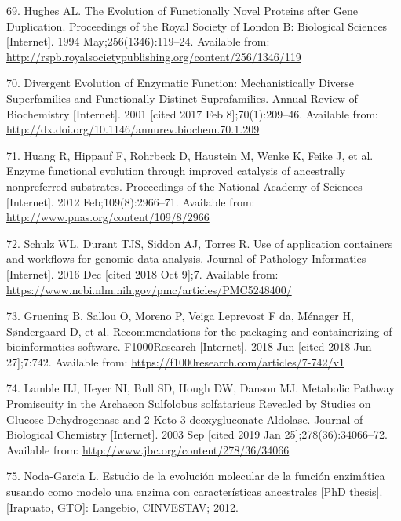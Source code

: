 \documentclass[12pt,twoside]{reedthesis}
\begin{document}
  \hypertarget{ref-hughes_evolution_1994}{}
  69. Hughes AL. The Evolution of Functionally Novel Proteins after Gene
  Duplication. Proceedings of the Royal Society of London B: Biological
  Sciences {[}Internet{]}. 1994 May;256(1346):119--24. Available from:
  \url{http://rspb.royalsocietypublishing.org/content/256/1346/119}
  
  \hypertarget{ref-gerlt_divergent_2001}{}
  70. Divergent Evolution of Enzymatic Function: Mechanistically Diverse
  Superfamilies and Functionally Distinct Suprafamilies. Annual Review of
  Biochemistry {[}Internet{]}. 2001 {[}cited 2017 Feb 8{]};70(1):209--46.
  Available from: \url{http://dx.doi.org/10.1146/annurev.biochem.70.1.209}
  
  \hypertarget{ref-huang_enzyme_2012}{}
  71. Huang R, Hippauf F, Rohrbeck D, Haustein M, Wenke K, Feike J, et al.
  Enzyme functional evolution through improved catalysis of ancestrally
  nonpreferred substrates. Proceedings of the National Academy of Sciences
  {[}Internet{]}. 2012 Feb;109(8):2966--71. Available from:
  \url{http://www.pnas.org/content/109/8/2966}
  
  \hypertarget{ref-schulz_use_2016}{}
  72. Schulz WL, Durant TJS, Siddon AJ, Torres R. Use of application
  containers and workflows for genomic data analysis. Journal of Pathology
  Informatics {[}Internet{]}. 2016 Dec {[}cited 2018 Oct 9{]};7. Available
  from: \url{https://www.ncbi.nlm.nih.gov/pmc/articles/PMC5248400/}
  
  \hypertarget{ref-gruening_recommendations_2018}{}
  73. Gruening B, Sallou O, Moreno P, Veiga Leprevost F da, Ménager H,
  Søndergaard D, et al. Recommendations for the packaging and
  containerizing of bioinformatics software. F1000Research {[}Internet{]}.
  2018 Jun {[}cited 2018 Jun 27{]};7:742. Available from:
  \url{https://f1000research.com/articles/7-742/v1}
  
  \hypertarget{ref-lamble_archaea_promiscuou_pathways_2003}{}
  74. Lamble HJ, Heyer NI, Bull SD, Hough DW, Danson MJ. Metabolic Pathway
  Promiscuity in the Archaeon Sulfolobus solfataricus Revealed by Studies
  on Glucose Dehydrogenase and 2-Keto-3-deoxygluconate Aldolase. Journal
  of Biological Chemistry {[}Internet{]}. 2003 Sep {[}cited 2019 Jan
  25{]};278(36):34066--72. Available from:
  \url{http://www.jbc.org/content/278/36/34066}
  
  \hypertarget{ref-noda_tesis_2012}{}
  75. Noda-Garcia L. Estudio de la evolución molecular de la función
  enzimática susando como modelo una enzima con características
  ancestrales {[}PhD thesis{]}. {[}Irapuato, GTO{]}: Langebio, CINVESTAV;
  2012.
  
\end{document}
